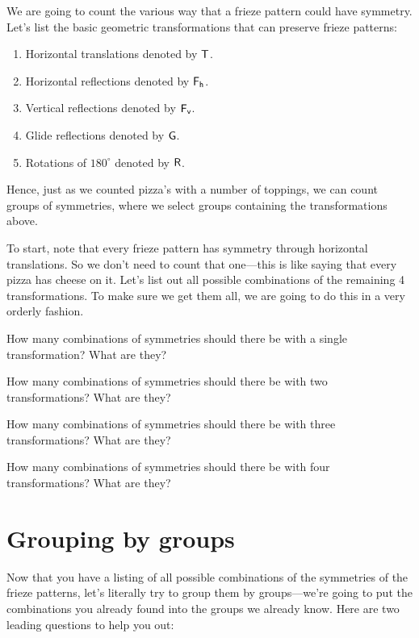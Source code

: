 \documentclass[nooutcomes,noauthor]{ximera}
\begin{document}
We are going to count the various way that a frieze pattern could have
symmetry. Let's list the basic geometric transformations that can
preserve frieze patterns:
\begin{enumerate}
\item Horizontal translations denoted by $\mathsf{T}$.
\item Horizontal reflections denoted by $\mathsf{F_h}$.
\item Vertical reflections denoted by $\mathsf{F_v}$.
\item Glide reflections denoted by $\mathsf{G}$.
\item Rotations of $180^\circ$ denoted by $\mathsf{R}$.
\end{enumerate}
Hence, just as we counted pizza's with a number of toppings, we can
count groups of symmetries, where we select groups containing the
transformations above.

To start, note that every frieze pattern has symmetry through horizontal
translations. So we don't need to count that one---this is like saying
that every pizza has cheese on it. Let's list out all possible combinations
of the remaining 4 transformations. To make sure we get them all, we are
going to do this in a very orderly fashion.

\begin{problem} 
How many combinations of symmetries should there be with a single
transformation?  What are they?
\end{problem}


\begin{problem} 
How many combinations of symmetries should there be with two
transformations?  What are they?
\end{problem}


\begin{problem} 
How many combinations of symmetries should there be with three
transformations?  What are they?
\end{problem}


\begin{problem} 
How many combinations of symmetries should there be with four
transformations?  What are they?
\end{problem}




\section{Grouping by groups}

Now that you have a listing of all possible combinations of the
symmetries of the frieze patterns, let's literally try to group them
by groups---we're going to put the combinations you already found into
the groups we already know. Here are two leading questions to help you
out:
\end{document}
